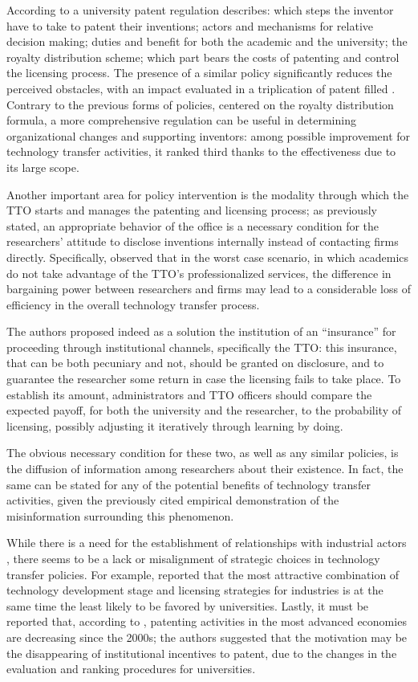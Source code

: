 According to \citet{Baldini2007} a university patent regulation describes: which steps the inventor have to take to patent their inventions; actors and mechanisms for relative decision making; duties and benefit for both the academic and the university; the royalty distribution scheme; which part bears the costs of patenting and control the licensing process. The presence of a similar policy significantly reduces the perceived obstacles, with an impact evaluated in a triplication of patent filled \citep{Baldini2006,Baldini2007}. Contrary to the previous forms of policies, centered on the royalty distribution formula, a more comprehensive regulation can be useful in determining organizational changes and supporting inventors: among possible improvement for technology transfer activities, it ranked third thanks to the effectiveness due to its large scope. 

Another important area for policy intervention is the modality through which the TTO starts and manages the patenting and licensing process; as previously stated, an appropriate behavior of the office is a necessary condition for the researchers' attitude to disclose inventions internally instead of contacting firms directly. Specifically, \citet{Panagopoulos2013} observed that in the worst case scenario, in which academics do not take advantage of the TTO's professionalized services, the difference in bargaining power between researchers and firms may lead to a considerable loss of efficiency in the overall technology transfer process.

The authors proposed indeed as a solution the institution of an \enquote{insurance} for proceeding through institutional channels, specifically the TTO: this insurance, that can be both pecuniary and not, should be granted on disclosure, and to guarantee the researcher some return in case the licensing fails to take place. To establish its amount, administrators and TTO officers should compare the expected payoff, for both the university and the researcher, to the probability of licensing, possibly adjusting it iteratively through learning by doing.

The obvious necessary condition for these two, as well as any similar policies, is the diffusion of information among researchers about their existence. In fact, the same can be stated for any of the potential benefits of technology transfer activities, given the previously cited empirical demonstration of the misinformation surrounding this phenomenon. 

While there is a need for the establishment of relationships with industrial actors \citep{Baldini2007}, there seems to be a lack or misalignment of strategic choices in technology transfer policies. For example, \citet{Phan2005} reported that the most attractive combination of technology development stage and licensing strategies for industries is at the same time the least likely to be favored by universities. Lastly, it must be reported that, according to \citet{Leydesdorff2010}, patenting activities in the most advanced economies are decreasing since the 2000s; the authors suggested that the motivation may be the disappearing of institutional incentives to patent, due to the changes in the evaluation and ranking procedures for universities.

